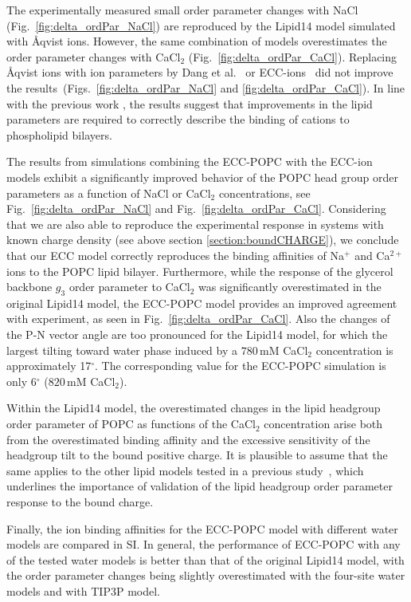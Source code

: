 The experimentally measured small order parameter 
changes with NaCl (Fig.~\ref{fig:delta_ordPar_NaCl})  
are reproduced by the Lipid14 model simulated with Åqvist ions. 
However, the same combination of models overestimates the order parameter changes with CaCl$_2$ (Fig.~\ref{fig:delta_ordPar_CaCl}). 
Replacing Åqvist ions with ion parameters by Dang et al.~\citep{smith94, chang1999, dang2006} 
or ECC-ions~\citep{martinek17, kohagen16, Pluharova2014} did not improve 
the results~(Figs.~\ref{fig:delta_ordPar_NaCl} and \ref{fig:delta_ordPar_CaCl}). 
In line with the previous work \citep{catte16}, the results suggest that improvements 
in the lipid parameters are required to correctly describe the binding of cations to phospholipid bilayers. 
 
The results from simulations combining the ECC-POPC with the ECC-ion models \citep{martinek17, kohagen16, Pluharova2014} exhibit a significantly improved behavior of the POPC head group order parameters as a function of NaCl or CaCl$_2$ concentrations, see Fig.~\ref{fig:delta_ordPar_NaCl} and Fig.~\ref{fig:delta_ordPar_CaCl}. Considering that we are also able to reproduce the experimental response in systems with known charge density (see above section \ref{section:boundCHARGE}), we conclude that our ECC model correctly reproduces the binding affinities of Na$^{+}$ and Ca$^{2+}$ ions to the POPC lipid bilayer. Furthermore, while the response of the glycerol backbone $g_3$ order parameter to CaCl$_2$ was significantly overestimated in the original Lipid14 model, the ECC-POPC model provides an improved agreement with experiment, as seen in Fig.~\ref{fig:delta_ordPar_CaCl}. 
Also the changes of the P-N vector angle are too pronounced for the Lipid14 model, 
for which the largest tilting toward water phase induced by a $780\,\mathrm{mM}$ 
CaCl$_2$ concentration is approximately 17$^{\circ}$. The corresponding value 
for the ECC-POPC simulation is only 6$^{\circ}$ ($820\,\mathrm{mM}$ CaCl$_2$).  
 
Within the Lipid14 model, the overestimated changes in the lipid headgroup order parameter of POPC  as functions of the CaCl$_2$ concentration arise both from the overestimated binding affinity and the excessive sensitivity of the headgroup tilt to the bound positive charge. It is plausible to assume that the same applies to the other lipid models tested in a previous study~\citep{catte16}, which underlines the importance of validation of the lipid headgroup order parameter response to the bound charge.  
 
Finally, the ion binding affinities for the ECC-POPC model with different water models are compared in SI. In general, the performance of ECC-POPC with any of the tested water models is better than that of the original Lipid14 model, with the order parameter changes being slightly overestimated with the four-site water models and with TIP3P model. 
 
